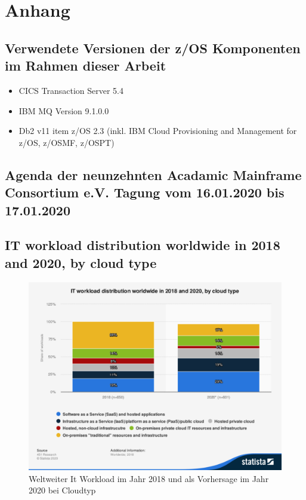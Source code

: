 \chapter{Anhang}\label{app:Anhang}

\section{Verwendete Versionen der z/OS Komponenten im Rahmen dieser Arbeit}
\begin{itemize}
\item CICS Transaction Server 5.4
\item IBM MQ Version 9.1.0.0 
\item Db2 v11
item z/OS 2.3 (inkl. IBM Cloud Provisioning and Management for z/OS, z/OSMF, z/OSPT)
\end{itemize}

\section{Agenda der neunzehnten Acadamic Mainframe Consortium e.V. Tagung vom 16.01.2020 bis 17.01.2020}\label{app:AMC}


\section{IT workload distribution worldwide in 2018 and 2020, by cloud type}
\begin{figure}[ht!]
\centering
\includegraphics[width=\textwidth]{figures/statistic_id748238_it-workload-distribution-globally-2018-and-2020-by-cloud-type.pdf}
\caption{Weltweiter It Workload im Jahr 2018 und als Vorhersage im Jahr 2020 bei Cloudtyp }
\label{app:itworkload}
\end{figure}

